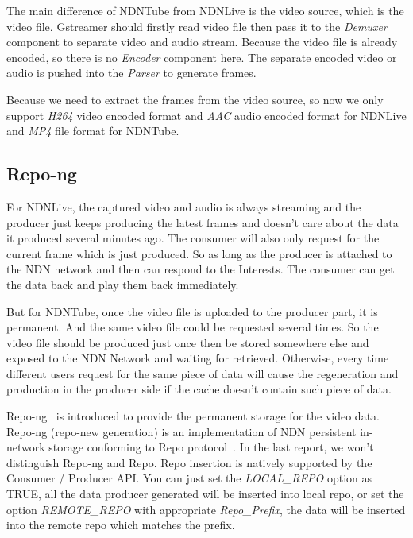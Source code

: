 The main difference of NDNTube from NDNLive is the video source, which is the video file. Gstreamer should firstly read video file then pass it to the \textit{Demuxer} component to separate video and audio stream. Because the video file is already encoded, so there is no \textit{Encoder} component here. The separate encoded video or audio is pushed into the \textit{Parser} to generate frames.

Because we need to extract the frames from the video source, so now we only support \textit{H264} video encoded format and \textit{AAC} audio encoded format for NDNLive and \textit{MP4} file format for NDNTube. 

\subsection{Repo-ng}
For NDNLive, the captured video and audio is always streaming and the producer just keeps producing the latest frames and doesn't care about the data it produced several minutes ago. The consumer will also only request for the current frame which is just produced. So as long as the producer is attached to the NDN network and then can respond to the Interests. The consumer can get the data back and play them back immediately.

But for NDNTube, once the video file is uploaded to the producer part, it is permanent. And the same video file could be requested several times. So the video file should be produced just once then be stored somewhere else and exposed to the NDN Network and waiting for retrieved. Otherwise, every time different users request for the same piece of data will cause the regeneration and production in the producer side if the cache doesn't contain such piece of data.

Repo-ng~\cite{repo-ng} is introduced to provide the permanent storage for the video data. Repo-ng (repo-new generation) is an implementation of NDN persistent in-network storage conforming to Repo protocol~\cite{Repo-Protocol}. In the last report, we won't distinguish Repo-ng and Repo. Repo insertion is natively supported by the Consumer / Producer API. You can just set the \textit{LOCAL\_REPO} option as TRUE, all the data producer generated will be inserted into local repo, or set the option \textit{REMOTE\_REPO} with appropriate \textit{Repo\_Prefix}, the data will be inserted into the remote repo which matches the prefix.
